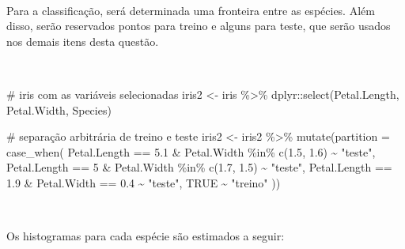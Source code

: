 \documentclass[
  a4paperpaper,
]{article}
\newenvironment{Shaded}{\begin{snugshade}}{\end{snugshade}}
\newcommand{\AttributeTok}[1]{\textcolor[rgb]{0.40,0.45,0.13}{#1}}
\newcommand{\CommentTok}[1]{\textcolor[rgb]{0.37,0.37,0.37}{#1}}
\newcommand{\ConstantTok}[1]{\textcolor[rgb]{0.56,0.35,0.01}{#1}}
\newcommand{\DecValTok}[1]{\textcolor[rgb]{0.68,0.00,0.00}{#1}}
\newcommand{\FloatTok}[1]{\textcolor[rgb]{0.68,0.00,0.00}{#1}}
\newcommand{\FunctionTok}[1]{\textcolor[rgb]{0.28,0.35,0.67}{#1}}
\newcommand{\NormalTok}[1]{\textcolor[rgb]{0.00,0.23,0.31}{#1}}
\newcommand{\OtherTok}[1]{\textcolor[rgb]{0.00,0.23,0.31}{#1}}
\newcommand{\SpecialCharTok}[1]{\textcolor[rgb]{0.37,0.37,0.37}{#1}}
\newcommand{\StringTok}[1]{\textcolor[rgb]{0.13,0.47,0.30}{#1}}
\begin{document}
~

Para a classificação, será determinada uma fronteira entre as espécies.
Além disso, serão reservados pontos para treino e alguns para teste, que
serão usados nos demais itens desta questão.

~

\begin{Shaded}
\begin{Highlighting}[]
\CommentTok{\# iris com as variáveis selecionadas}
\NormalTok{iris2 }\OtherTok{\textless{}{-}}\NormalTok{ iris }\SpecialCharTok{\%\textgreater{}\%}\NormalTok{ dplyr}\SpecialCharTok{::}\FunctionTok{select}\NormalTok{(Petal.Length, Petal.Width, Species)}

\CommentTok{\# separação arbitrária de treino e teste}
\NormalTok{iris2 }\OtherTok{\textless{}{-}}\NormalTok{ iris2 }\SpecialCharTok{\%\textgreater{}\%}
  \FunctionTok{mutate}\NormalTok{(}\AttributeTok{partition =} \FunctionTok{case\_when}\NormalTok{(}
\NormalTok{    Petal.Length }\SpecialCharTok{==} \FloatTok{5.1} \SpecialCharTok{\&}\NormalTok{ Petal.Width }\SpecialCharTok{\%in\%} \FunctionTok{c}\NormalTok{(}\FloatTok{1.5}\NormalTok{, }\FloatTok{1.6}\NormalTok{) }\SpecialCharTok{\textasciitilde{}} \StringTok{"teste"}\NormalTok{,}
\NormalTok{    Petal.Length }\SpecialCharTok{==} \DecValTok{5} \SpecialCharTok{\&}\NormalTok{ Petal.Width }\SpecialCharTok{\%in\%} \FunctionTok{c}\NormalTok{(}\FloatTok{1.7}\NormalTok{, }\FloatTok{1.5}\NormalTok{) }\SpecialCharTok{\textasciitilde{}} \StringTok{"teste"}\NormalTok{,}
\NormalTok{    Petal.Length }\SpecialCharTok{==} \FloatTok{1.9} \SpecialCharTok{\&}\NormalTok{ Petal.Width }\SpecialCharTok{==} \FloatTok{0.4} \SpecialCharTok{\textasciitilde{}} \StringTok{"teste"}\NormalTok{,}
    \ConstantTok{TRUE} \SpecialCharTok{\textasciitilde{}} \StringTok{"treino"}
\NormalTok{  ))}
\end{Highlighting}
\end{Shaded}

~

Os histogramas para cada espécie são estimados a seguir:

~

\begin{Shaded}
\end{Shaded}
\end{document}
